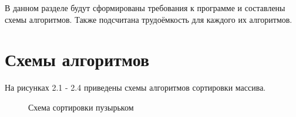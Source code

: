 \documentclass[12pt,a4paper]{report}
\begin{document}
В данном разделе будут сформированы требования к программе и составлены схемы алгоритмов.
Также подсчитана трудоёмкость для каждого их алгоритмов.


\section{Схемы алгоритмов}

На рисунках 2.1 - 2.4 приведены схемы алгоритмов сортировки массива.

\begin{figure}[h!]
    \caption{Схема сортировки пузырьком}
    \label{fig:image}
\end{figure}
\end{document}
